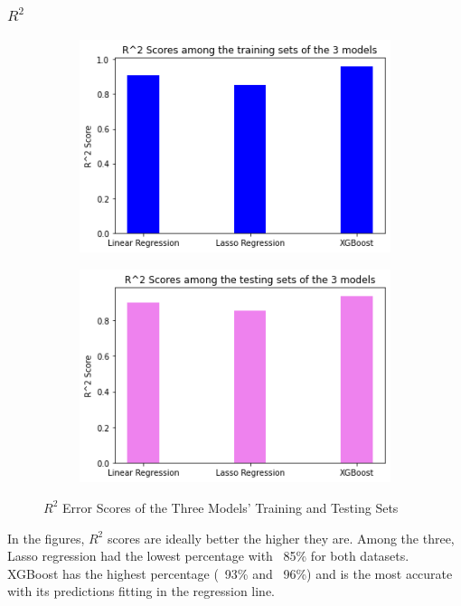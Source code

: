 \documentclass[runningheads]{llncs}
\begin{document}
\subsubsection{$R^2$}
\;
\begin{figure}
	\begin{subfigure}{.5\textwidth}
		\centering
		\includegraphics[width=.8\linewidth]{FIGURES/train_r2.png}
		
	\end{subfigure}%
	\begin{subfigure}{.5\textwidth}
		\centering
		\includegraphics[width=.8\linewidth]{FIGURES/test_r2.png}
		
	\end{subfigure}
	\caption{$R^2$ Error Scores of the Three Models’ Training and Testing Sets}
\end{figure}

In the figures, $R^2$ scores are ideally better the higher they are. Among the three, Lasso regression had the lowest percentage with ~85\% for both datasets. XGBoost has the highest percentage (~93\% and ~96\%) and is the most accurate with its predictions fitting in the regression line.
\end{document}
